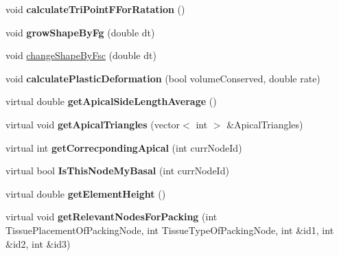 \begin{DoxyCompactItemize}
\item 
\hypertarget{classShapeBase_a5f5e95f38f271d28f2856109b0256aa0}{}void {\bfseries calculate\+Tri\+Point\+F\+For\+Ratation} ()\label{classShapeBase_a5f5e95f38f271d28f2856109b0256aa0}

\item 
\hypertarget{classShapeBase_aa83e1b27ea3a67b958afd06f9095e0de}{}void {\bfseries grow\+Shape\+By\+Fg} (double dt)\label{classShapeBase_aa83e1b27ea3a67b958afd06f9095e0de}

\item 
void \hyperlink{classShapeBase_a5409de18ee9e47af0bb977f4a1e608fb}{change\+Shape\+By\+Fsc} (double dt)
\item 
\hypertarget{classShapeBase_a35681881a6597bb1c0788ec219a77282}{}void {\bfseries calculate\+Plastic\+Deformation} (bool volume\+Conserved, double rate)\label{classShapeBase_a35681881a6597bb1c0788ec219a77282}

\item 
\hypertarget{classShapeBase_a6d8088a8bb897d79a796a253c06d954f}{}virtual double {\bfseries get\+Apical\+Side\+Length\+Average} ()\label{classShapeBase_a6d8088a8bb897d79a796a253c06d954f}

\item 
\hypertarget{classShapeBase_a440ec12735963373a1e90922c0b57bac}{}virtual void {\bfseries get\+Apical\+Triangles} (vector$<$ int $>$ \&Apical\+Triangles)\label{classShapeBase_a440ec12735963373a1e90922c0b57bac}

\item 
\hypertarget{classShapeBase_ac210b3828c14aa394e6e2222617ddcfa}{}virtual int {\bfseries get\+Correcponding\+Apical} (int curr\+Node\+Id)\label{classShapeBase_ac210b3828c14aa394e6e2222617ddcfa}

\item 
\hypertarget{classShapeBase_abc13c22e407ba29384b0995a55f32463}{}virtual bool {\bfseries Is\+This\+Node\+My\+Basal} (int curr\+Node\+Id)\label{classShapeBase_abc13c22e407ba29384b0995a55f32463}

\item 
\hypertarget{classShapeBase_a995a5e6a553ed0cdaadf74dab4f88822}{}virtual double {\bfseries get\+Element\+Height} ()\label{classShapeBase_a995a5e6a553ed0cdaadf74dab4f88822}

\item 
\hypertarget{classShapeBase_a2177773f629648276202a5beca81a4e8}{}virtual void {\bfseries get\+Relevant\+Nodes\+For\+Packing} (int Tissue\+Placement\+Of\+Packing\+Node, int Tissue\+Type\+Of\+Packing\+Node, int \&id1, int \&id2, int \&id3)\label{classShapeBase_a2177773f629648276202a5beca81a4e8}


\end{DoxyCompactItemize}
